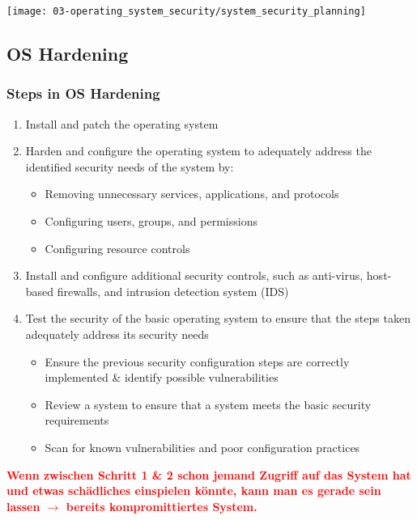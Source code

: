 \begin{center}
    \vspace{-8pt}
    \texttt{[image: 03-operating\_system\_security/system\_security\_planning]}
    \vspace{-8pt}
\end{center}

\subsection{OS Hardening}\label{subsec:os-hardening}

\subsubsection{Steps in OS Hardening}
\begin{enumerate}
    \item Install and patch the operating system
    \item Harden and configure the operating system to adequately address the identified security needs of the system by:
    \begin{itemize}
        \item Removing unnecessary services, applications, and protocols
        \item Configuring users, groups, and permissions
        \item Configuring resource controls
    \end{itemize}
    \item Install and configure additional security controls, such as anti-virus, host-based firewalls, and intrusion detection system (IDS)
    \item Test the security of the basic operating system to ensure that the steps taken adequately address its security needs
    \begin{itemize}
        \item Ensure the previous security configuration steps are correctly implemented \& identify possible vulnerabilities
        \item Review a system to ensure that a system meets the basic security requirements
        \item Scan for known vulnerabilities and poor configuration practices\\
    \end{itemize}
\end{enumerate}

\textcolor{red}{\textbf{Wenn zwischen Schritt 1 \& 2 schon jemand Zugriff auf das System hat und etwas schädliches einspielen könnte, kann man es gerade sein lassen $\rightarrow$ bereits kompromittiertes System.}}

